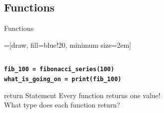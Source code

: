     \subsection{Functions}
        \begin{frame}{Functions}
            \Large
            \begin{center}
                =[draw, fill=blue!20, minimum size=2em]
            \end{center}
            \pause
            \inputminted[frame=single,framesep=2pt]{python3}{code-examples/function_def.py}
            \pause
            \textbf{\texttt{fib\_100 = fibonacci\_series(100)}}\\
            \pause
            \textbf{\texttt{what\_is\_going\_on = print(fib\_100)}}
        \end{frame}

        \begin{frame}{return Statement}
            \Large
            Every function returns one value!\\
            \pause
            What type does each function return?
            \normalsize
            \begin{columns}
                \begin{column}{0.35\textwidth}
                    \pause
                    \inputminted[frame=single, framesep=2pt]{python3}{code-examples/return_int.py}
                \end{column}
                \begin{column}{0.6\textwidth}
                    \pause
                    \inputminted[frame=single, framesep=2pt]{python3}{code-examples/return_string.py}
                \end{column}
            \end{columns}  
        \pause
            \inputminted[frame=single, framesep=2pt]{python3}{code-examples/return_none.py}
            \pause
            \inputminted[frame=single, framesep=2pt]{python3}{code-examples/return_list.py}
        \end{frame}
    
